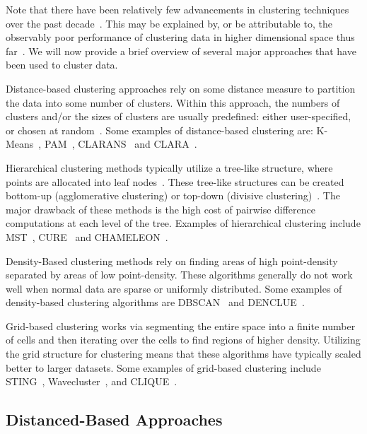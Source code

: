 Note that there have been relatively few advancements in clustering techniques over the past decade~\cite{wang2019progress}. This may be explained by, or be attributable to, the observably poor performance of clustering data in higher dimensional space thus far~\cite{zhang2013advancements}.
We will now provide a brief overview of several major approaches that have been used to cluster data.

Distance-based clustering approaches rely on some distance measure to partition the data into some number of clusters.
Within this approach, the numbers of clusters and/or the sizes of clusters are usually predefined: either user-specified, or chosen at random~\cite{wang2019progress}.
Some examples of distance-based clustering are:
K-Means~\cite{macqueen1967some}, 
PAM~\cite{kaufman2009finding}, 
CLARANS~\cite{ng1994efficient} and
CLARA~\cite{kaufman2009finding}.

Hierarchical clustering methods typically utilize a tree-like structure, where points are allocated into leaf nodes~\cite{wang2019progress}.
These tree-like structures can be created bottom-up (agglomerative clustering) or top-down (divisive clustering)~\cite{agrawal1998automatic}.
The major drawback of these methods is the high cost of pairwise difference computations at each level of the tree.
Examples of hierarchical clustering include 
MST~\cite{charles_zahn_graph_1971}, 
CURE~\cite{guha1998cure} and
CHAMELEON~\cite{karypis1999hierarchical}.

Density-Based clustering methods rely on finding areas of high point-density separated by areas of low point-density.
These algorithms generally do not work well when normal data are sparse or uniformly distributed.
Some examples of density-based clustering algorithms are
DBSCAN~\cite{ester1996density} and
DENCLUE~\cite{hinneburg1998efficient}.

Grid-based clustering works via segmenting the entire space into a finite number of cells and then iterating over the cells to find regions of higher density.
Utilizing the grid structure for clustering means that these algorithms have typically scaled better to larger datasets.
Some examples of grid-based clustering include
STING~\cite{wang1997sting}, 
Wavecluster~\cite{sheikholeslami2000wavecluster}, and
CLIQUE~\cite{agrawal1998automatic}.

\subsection{Distanced-Based Approaches}

